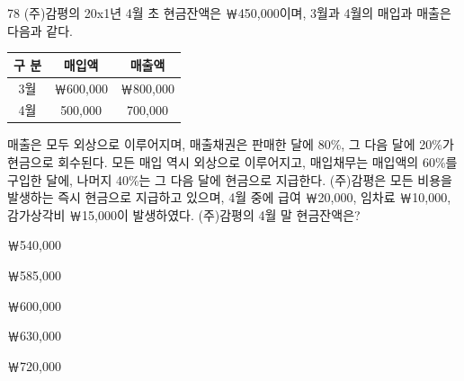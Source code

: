 \begin{question}{78}
(주)감평의 20x1년 4월 초 현금잔액은 ￦450,000이며, 3월과 4월의 매입과 매출은 다음과 같다.
\par{\small\centering\begin{tabular}{|c|c|c|}\hline
구 분 & 매입액 & 매출액 \\ \hline
3월 & ￦600,000 & ￦800,000 \\ \hline
4월 & 500,000 & 700,000 \\ \hline
\end{tabular}\par}
매출은 모두 외상으로 이루어지며, 매출채권은 판매한 달에 80\%, 그 다음 달에 20\%가 현금으로 회수된다. 모든 매입 역시 외상으로 이루어지고, 매입채무는 매입액의 60\%를 구입한 달에, 나머지 40\%는 그 다음 달에 현금으로 지급한다. (주)감평은 모든 비용을 발생하는 즉시 현금으로 지급하고 있으며, 4월 중에 급여 ￦20,000, 임차료 ￦10,000, 감가상각비 ￦15,000이 발생하였다. (주)감평의 4월 말 현금잔액은?
\begin{choices}
  \item ￦540,000
  \item ￦585,000
  \item ￦600,000
  \item ￦630,000
  \item ￦720,000
\end{choices}
\end{question}
